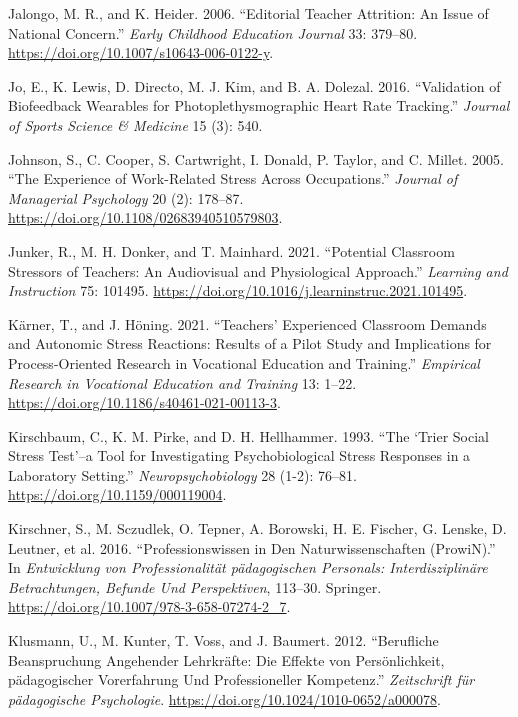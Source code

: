 \documentclass[preprint,
3p]{elsarticle} %
\newlength{\cslhangindent}
\newenvironment{CSLReferences}[2] %
 {\begin{list}{}{%
  \setlength{\itemindent}{0pt}
  \setlength{\leftmargin}{0pt}
  \setlength{\parsep}{0pt}
  \ifodd #1
   \setlength{\leftmargin}{\cslhangindent}
   \setlength{\itemindent}{-1\cslhangindent}
  \fi
  \setlength{\itemsep}{#2\baselineskip}}}
 {\end{list}}
\begin{document}
\begin{CSLReferences}{1}{0}
Jalongo, M. R., and K. Heider. 2006. {``Editorial Teacher Attrition: An
Issue of National Concern.''} \emph{Early Childhood Education Journal}
33: 379--80. \url{https://doi.org/10.1007/s10643-006-0122-y}.

Jo, E., K. Lewis, D. Directo, M. J. Kim, and B. A. Dolezal. 2016.
{``Validation of Biofeedback Wearables for Photoplethysmographic Heart
Rate Tracking.''} \emph{Journal of Sports Science \& Medicine} 15 (3):
540.

Johnson, S., C. Cooper, S. Cartwright, I. Donald, P. Taylor, and C.
Millet. 2005. {``The Experience of Work-Related Stress Across
Occupations.''} \emph{Journal of Managerial Psychology} 20 (2): 178--87.
\url{https://doi.org/10.1108/02683940510579803}.

Junker, R., M. H. Donker, and T. Mainhard. 2021. {``Potential Classroom
Stressors of Teachers: An Audiovisual and Physiological Approach.''}
\emph{Learning and Instruction} 75: 101495.
\url{https://doi.org/10.1016/j.learninstruc.2021.101495}.

Kärner, T., and J. Höning. 2021. {``Teachers' Experienced Classroom
Demands and Autonomic Stress Reactions: Results of a Pilot Study and
Implications for Process-Oriented Research in Vocational Education and
Training.''} \emph{Empirical Research in Vocational Education and
Training} 13: 1--22. \url{https://doi.org/10.1186/s40461-021-00113-3}.

Kirschbaum, C., K. M. Pirke, and D. H. Hellhammer. 1993. {``The {`Trier
Social Stress Test'}--a Tool for Investigating Psychobiological Stress
Responses in a Laboratory Setting.''} \emph{Neuropsychobiology} 28
(1-2): 76--81. \url{https://doi.org/10.1159/000119004}.

Kirschner, S., M. Sczudlek, O. Tepner, A. Borowski, H. E. Fischer, G.
Lenske, D. Leutner, et al. 2016. {``Professionswissen in Den
Naturwissenschaften (ProwiN).''} In \emph{Entwicklung von
Professionalit{ä}t p{ä}dagogischen Personals: Interdisziplin{ä}re
Betrachtungen, Befunde Und Perspektiven}, 113--30. Springer.
\url{https://doi.org/10.1007/978-3-658-07274-2_7}.

Klusmann, U., M. Kunter, T. Voss, and J. Baumert. 2012. {``Berufliche
Beanspruchung Angehender Lehrkr{ä}fte: Die Effekte von Pers{ö}nlichkeit,
p{ä}dagogischer Vorerfahrung Und Professioneller Kompetenz.''}
\emph{Zeitschrift f{ü}r p{ä}dagogische Psychologie}.
\url{https://doi.org/10.1024/1010-0652/a000078}.


\end{CSLReferences}
\end{document}
